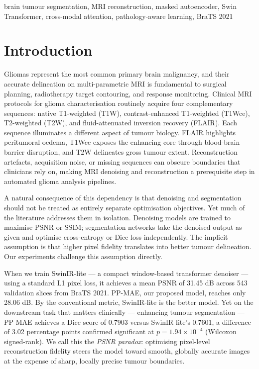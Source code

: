 \documentclass[conference]{IEEEtran}
\begin{document}
\begin{IEEEkeywords}
brain tumour segmentation, MRI reconstruction, masked autoencoder,
Swin Transformer, cross-modal attention, pathology-aware learning,
BraTS 2021
\end{IEEEkeywords}

\section{Introduction}

Gliomas represent the most common primary brain malignancy, and
their accurate delineation on multi-parametric MRI is fundamental
to surgical planning, radiotherapy target contouring, and response
monitoring. Clinical MRI protocols for glioma characterisation
routinely acquire four complementary sequences: native T1-weighted
(T1W), contrast-enhanced T1-weighted (T1Wce), T2-weighted (T2W),
and fluid-attenuated inversion recovery (FLAIR). Each sequence
illuminates a different aspect of tumour biology. FLAIR highlights
peritumoral oedema, T1Wce exposes the enhancing core through
blood-brain barrier disruption, and T2W delineates gross tumour
extent. Reconstruction artefacts, acquisition noise, or missing
sequences can obscure boundaries that clinicians rely on, making
MRI denoising and reconstruction a prerequisite step in automated
glioma analysis pipelines.

A natural consequence of this dependency is that denoising and
segmentation should not be treated as entirely separate optimisation
objectives. Yet much of the literature addresses them in isolation.
Denoising models are trained to maximise PSNR or SSIM; segmentation
networks take the denoised output as given and optimise cross-entropy
or Dice loss independently. The implicit assumption is that higher
pixel fidelity translates into better tumour delineation. Our
experiments challenge this assumption directly.

When we train SwinIR-lite \cite{liang2021swinir} — a compact window-based
transformer denoiser — using a standard L1 pixel loss, it achieves a
mean PSNR of 31.45 dB across 543 validation slices from BraTS 2021.
PP-MAE, our proposed model, reaches only 28.06 dB. By the conventional
metric, SwinIR-lite is the better model. Yet on the downstream
task that matters clinically — enhancing tumour segmentation — PP-MAE
achieves a Dice score of 0.7903 versus SwinIR-lite's 0.7601, a
difference of 3.02 percentage points confirmed significant at
$p = 1.94 \times 10^{-4}$ (Wilcoxon signed-rank). We call this the
\emph{PSNR paradox}: optimising pixel-level reconstruction fidelity
steers the model toward smooth, globally accurate images at the
expense of sharp, locally precise tumour boundaries.
\end{document}
